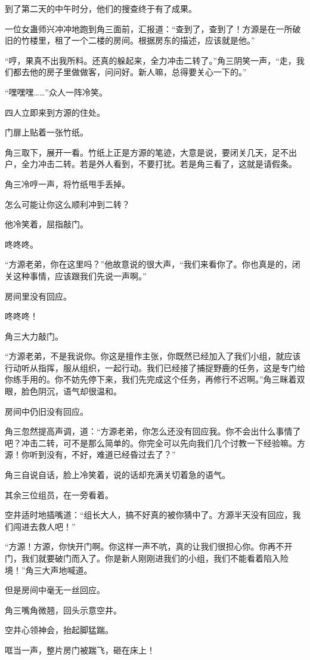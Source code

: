 \begin{this_body}
到了第二天的中午时分，他们的搜查终于有了成果。

一位女蛊师兴冲冲地跑到角三面前，汇报道：“查到了，查到了！方源是在一所破旧的竹楼里，租了一个二楼的房间。根据房东的描述，应该就是他。”

“哼，果真不出我所料。还真的躲起来，全力冲击二转了。”角三阴笑一声，“走，我们都去他的房子里做做客，问问好。新人嘛，总得要关心一下的。”

“嘿嘿嘿……”众人一阵冷笑。

四人立即来到方源的住处。

门扉上贴着一张竹纸。

角三取下，展开一看。竹纸上正是方源的笔迹，大意是说，要闭关几天，足不出户，全力冲击二转。若是外人看到，不要打扰。若是角三看了，这就是请假条。

角三冷哼一声，将竹纸甩手丢掉。

怎么可能让你这么顺利冲到二转？

他冷笑着，屈指敲门。

咚咚咚。

“方源老弟，你在这里吗？”他故意说的很大声，“我们来看你了。你也真是的，闭关这种事情，应该跟我们先说一声啊。”

房间里没有回应。

咚咚咚！

角三大力敲门。

“方源老弟，不是我说你。你这是擅作主张，你既然已经加入了我们小组，就应该行动听从指挥，服从组织，一起行动。我们已经接了捕捉野鹿的任务，这是专门给你练手用的。你不妨先停下来，我们先完成这个任务，再修行不迟啊。”角三眯着双眼，脸色阴沉，语气却很温和。

房间中仍旧没有回应。

角三忽然提高声调，道：“方源老弟，你怎么还没有回应我。你不会出什么事情了吧？冲击二转，可不是那么简单的。你完全可以先向我们几个讨教一下经验嘛。方源！你听到没有，不好，难道已经昏过去了？”

角三自说自话，脸上冷笑着，说的话却充满关切着急的语气。

其余三位组员，在一旁看着。

空井适时地插嘴道：“组长大人，搞不好真的被你猜中了。方源半天没有回应，我们闯进去救人吧！”

“方源！方源，你快开门啊。你这样一声不吭，真的让我们很担心你。你再不开门，我们就要破门而入了。你是新人刚刚进我们的小组，我们不能看着陷入险境！”角三大声地喊道。

但是房间中毫无一丝回应。

角三嘴角微翘，回头示意空井。

空井心领神会，抬起脚猛踹。

哐当一声，整片房门被踹飞，砸在床上！

\end{this_body}

